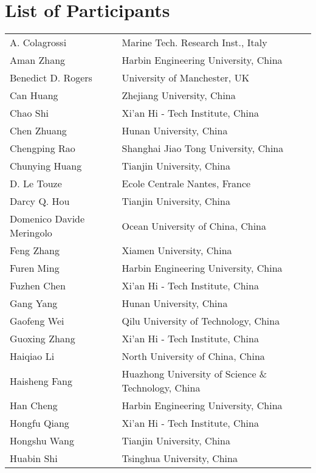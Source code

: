 \chapter*{List of Participants}
\chead{}
 \mtcaddchapter

\renewcommand{\arraystretch}{1.2}
\vspace{-5em}
\begin{longtable}{ll}
A. Colagrossi&	Marine Tech. Research Inst., Italy\\ 
Aman Zhang&	Harbin Engineering University, China\\ 
Benedict D. Rogers&	University of Manchester, UK\\ 
Can Huang&	Zhejiang University, China\\ 
Chao Shi&	Xi'an Hi - Tech Institute, China\\ 
Chen Zhuang&	Hunan University, China\\ 
Chengping Rao&	Shanghai Jiao Tong University, China\\ 
Chunying Huang&	Tianjin University, China\\ 
D. Le Touze&	Ecole Centrale Nantes, France\\ 
Darcy Q. Hou&	Tianjin University, China\\ 
Domenico Davide Meringolo&	Ocean University of China, China\\ 
Feng Zhang&	Xiamen University, China\\ 
Furen Ming&	Harbin Engineering University, China\\ 
Fuzhen Chen&	Xi'an Hi - Tech Institute, China\\ 
Gang Yang&	Hunan University, China\\ 
Gaofeng Wei&	Qilu University of Technology, China\\ 
Guoxing Zhang &	Xi'an Hi - Tech Institute, China\\ 
Haiqiao Li&	North University of China, China\\ 
Haisheng Fang&	Huazhong University of Science \& Technology, China\\ 
Han Cheng&	Harbin Engineering University, China\\ 
Hongfu Qiang&	Xi'an Hi - Tech Institute, China\\ 
Hongshu Wang&	Tianjin University, China\\ 
Huabin Shi&	Tsinghua University, China\\ 

\end{longtable}
